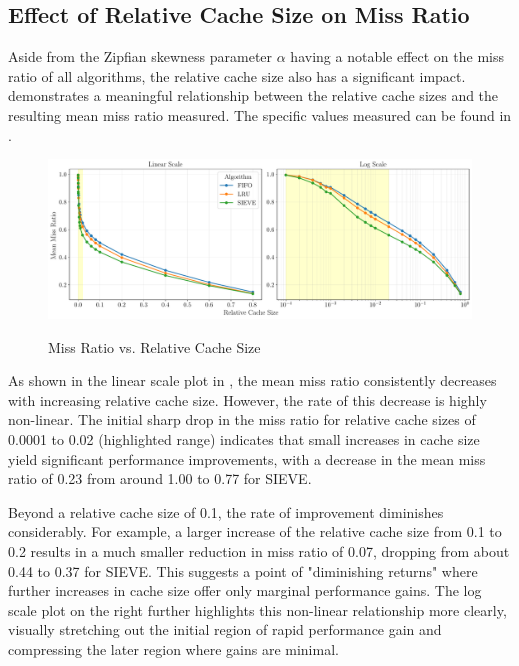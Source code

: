 \subsection{Effect of Relative Cache Size on Miss Ratio}\label{results:miss-ratio-vs-relative-cache-size}


Aside from the Zipfian skewness parameter $\alpha$ having a notable effect on the miss ratio of all algorithms, the relative cache size also has a significant impact.  demonstrates a meaningful relationship between the relative cache sizes and the resulting mean miss ratio measured. The specific values measured can be found in .

\begin{figure}[h!]
    \centering
    \caption{Miss Ratio vs. Relative Cache Size}
    \includegraphics[width=\linewidth]{figures/simulations/miss_ratio_vs_cache_size_both.pdf}
    \label{fig:miss-ratio-cache-size}
\end{figure}

As shown in the linear scale plot in , the mean miss ratio consistently decreases with increasing relative cache size. However, the rate of this decrease is highly non-linear. The initial sharp drop in the miss ratio for relative cache sizes of 0.0001 to 0.02 (highlighted range) indicates that small increases in cache size yield significant performance improvements, with a decrease in the mean miss ratio of 0.23 from around 1.00 to 0.77 for SIEVE.

Beyond a relative cache size of 0.1, the rate of improvement diminishes considerably. For example, a larger increase of the relative cache size from 0.1 to 0.2 results in a much smaller reduction in miss ratio of 0.07, dropping from about 0.44 to 0.37 for SIEVE. This suggests a point of "diminishing returns" where further increases in cache size offer only marginal performance gains. The log scale plot on the right further highlights this non-linear relationship more clearly, visually stretching out the initial region of rapid performance gain and compressing the later region where gains are minimal.

